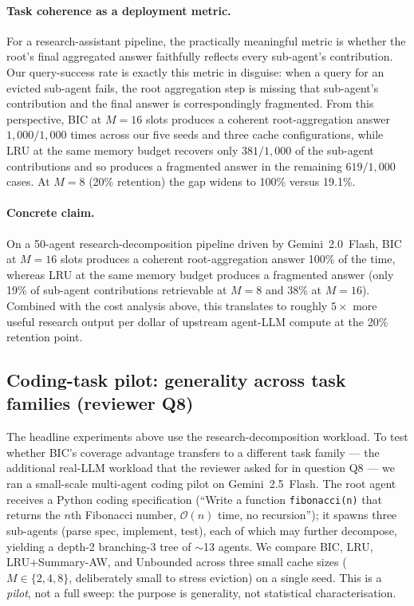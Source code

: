 \documentclass[fleqn,10pt]{article}
\theoremstyle{definition}
\newcommand{\Oh}{\mathcal{O}}
\newcommand{\slots}{M}
\begin{document}
\paragraph{Task coherence as a deployment metric.}
For a research-assistant pipeline, the practically meaningful
metric is whether the root's final aggregated answer faithfully
reflects every sub-agent's contribution. Our query-success rate is
exactly this metric in disguise: when a query for an evicted
sub-agent fails, the root aggregation step is missing that
sub-agent's contribution and the final answer is correspondingly
fragmented. From this perspective, BIC at $\slots{=}16$ slots
produces a coherent root-aggregation answer $1{,}000/1{,}000$
times across our five seeds and three cache configurations, while
LRU at the same memory budget recovers only $381/1{,}000$ of the
sub-agent contributions and so produces a fragmented answer in the
remaining $619/1{,}000$ cases. At $\slots{=}8$ (20\% retention) the
gap widens to 100\% versus 19.1\%.

\paragraph{Concrete claim.}
On a 50-agent research-decomposition pipeline driven by
Gemini~2.0~Flash, BIC at $\slots{=}16$ slots produces a coherent
root-aggregation answer 100\% of the time, whereas LRU at the
same memory budget produces a fragmented answer (only 19\% of
sub-agent contributions retrievable at $\slots{=}8$ and 38\% at
$\slots{=}16$). Combined with the cost analysis above, this
translates to roughly $5\times$ more useful research output per
dollar of upstream agent-LLM compute at the 20\% retention point.

\subsection*{Coding-task pilot: generality across task families (reviewer Q8)}

The headline experiments above use the research-decomposition
workload. To test whether BIC's coverage advantage transfers to a
different task family --- the additional real-LLM workload that the
reviewer asked for in question Q8 --- we ran a small-scale
multi-agent coding pilot on Gemini~2.5~Flash. The root agent
receives a Python coding specification (``Write a function
\texttt{fibonacci(n)} that returns the $n$th Fibonacci number,
$\Oh(n)$ time, no recursion''); it spawns three sub-agents (parse
spec, implement, test), each of which may further decompose,
yielding a depth-2 branching-3 tree of $\sim$13 agents. We compare
BIC, LRU, LRU+Summary-AW, and Unbounded across three small cache
sizes ($\slots \in \{2, 4, 8\}$, deliberately small to stress
eviction) on a single seed. This is a \emph{pilot}, not a full
sweep: the purpose is generality, not statistical
characterisation.
\end{document}

